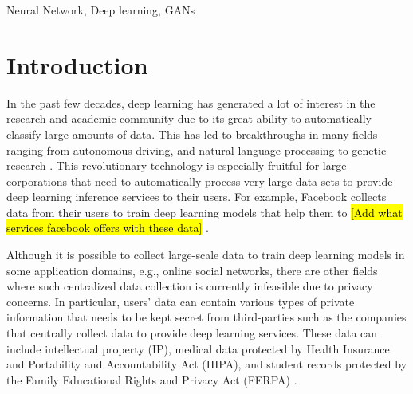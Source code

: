 \documentclass[conference]{IEEEtran}
\begin{document}
\begin{IEEEkeywords}
Neural Network, Deep learning, GANs
\end{IEEEkeywords}

\section{Introduction}
In the past few decades, deep learning has generated a lot of interest in the research and academic community due to its great ability
to automatically classify large amounts of data. This has led to breakthroughs in many fields ranging
from autonomous driving, and natural language processing to genetic research \cite{}.
This revolutionary technology is especially fruitful for large corporations that need to automatically process very large data sets
to provide deep learning inference services to their users. For example, Facebook collects data from their users to train deep learning
models that help them to \hl{[Add what services facebook offers with these data]} \cite{}.


Although it is possible to collect large-scale data to train deep learning models in some application domains, e.g., online social
networks, there are other fields where such centralized data collection is currently infeasible due to privacy
concerns.
In particular, users' data can contain various types of private information that needs to be kept secret from third-parties such as the
companies that centrally collect data to provide deep learning services. These data
can include
intellectual property (IP), 
medical data protected by Health Insurance and Portability and Accountability Act (HIPA), and student records protected by the Family
Educational Rights and Privacy Act (FERPA) \cite{act1996health,blechner2002health}. 
\end{document}
